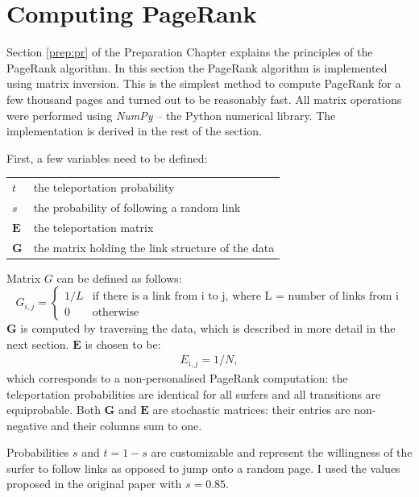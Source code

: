 \documentclass[12pt,a4paper,notitlepage,twoside]{scrbook}
\begin{document}
\section{Computing PageRank} 
\label{impl:pr}

Section \ref{prep:pr} of the Preparation Chapter explains the principles of the PageRank
algorithm. In this section the PageRank algorithm is implemented using matrix inversion.
This is the simplest method to compute PageRank for a few thousand pages and turned
out to be reasonably fast. All matrix operations were performed using \textit{NumPy} --
the Python numerical library. The implementation is derived in the rest of the section.

First, a few variables need to be defined:

\begin{tabular}[h!]{l l}
	\(t\) & the teleportation probability \\
	\(s\) & the probability of following a random link \\
	\(\bm{E}\) & the teleportation matrix \\
	\(\bm{G}\) & the matrix holding the link structure of the data \\
\end{tabular}

Matrix \(G\) can be defined as follows:
\begin{equation*}
	G_{i,j} = \begin{cases}
    1/L & \text{if there is a link from i to j, where L = number of links from i}\\
    0   & \text{otherwise}
  \end{cases}
\end{equation*}
\(\bm{G}\) is computed by traversing the data, which is described in more detail in the next
section. \(\bm{E}\) is chosen to be:
\begin{gather*}
	E_{i,j} = 1/N, 
\end{gather*}
which corresponds to a non-personalised PageRank computation: the teleportation
probabilities are identical for all surfers and all transitions are equiprobable.
Both \(\bm{G}\) and \(\bm{E}\) are stochastic matrices: their entries are non-negative and their columns sum
to one.

Probabilities \(s\) and \(t=1-s\) are customizable and represent the willingness of the surfer to
follow links as opposed to jump onto a random page. I used the values proposed in the
original paper\cite{pagerank} with \(s=0.85\).
\end{document}
